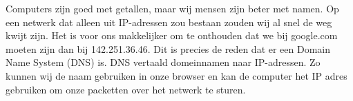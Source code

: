 Computers zijn goed met getallen, maar wij mensen zijn beter met namen. Op een netwerk dat alleen uit IP-adressen zou bestaan zouden wij al snel de weg kwijt zijn. Het is voor ons makkelijker om te onthouden dat we bij google.com moeten zijn dan bij 142.251.36.46. Dit is precies de reden dat er een Domain Name System (DNS) is. DNS vertaald domeinnamen naar IP-adressen. Zo kunnen wij de naam gebruiken in onze browser en kan de computer het IP adres gebruiken om onze packetten over het netwerk te sturen.

